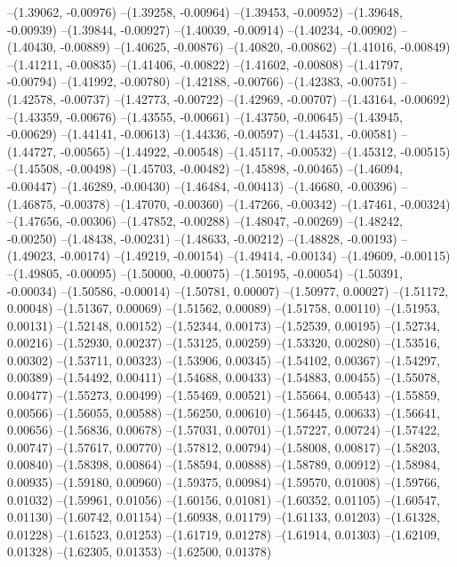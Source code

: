 --(1.39062, -0.00976)
--(1.39258, -0.00964)
--(1.39453, -0.00952)
--(1.39648, -0.00939)
--(1.39844, -0.00927)
--(1.40039, -0.00914)
--(1.40234, -0.00902)
--(1.40430, -0.00889)
--(1.40625, -0.00876)
--(1.40820, -0.00862)
--(1.41016, -0.00849)
--(1.41211, -0.00835)
--(1.41406, -0.00822)
--(1.41602, -0.00808)
--(1.41797, -0.00794)
--(1.41992, -0.00780)
--(1.42188, -0.00766)
--(1.42383, -0.00751)
--(1.42578, -0.00737)
--(1.42773, -0.00722)
--(1.42969, -0.00707)
--(1.43164, -0.00692)
--(1.43359, -0.00676)
--(1.43555, -0.00661)
--(1.43750, -0.00645)
--(1.43945, -0.00629)
--(1.44141, -0.00613)
--(1.44336, -0.00597)
--(1.44531, -0.00581)
--(1.44727, -0.00565)
--(1.44922, -0.00548)
--(1.45117, -0.00532)
--(1.45312, -0.00515)
--(1.45508, -0.00498)
--(1.45703, -0.00482)
--(1.45898, -0.00465)
--(1.46094, -0.00447)
--(1.46289, -0.00430)
--(1.46484, -0.00413)
--(1.46680, -0.00396)
--(1.46875, -0.00378)
--(1.47070, -0.00360)
--(1.47266, -0.00342)
--(1.47461, -0.00324)
--(1.47656, -0.00306)
--(1.47852, -0.00288)
--(1.48047, -0.00269)
--(1.48242, -0.00250)
--(1.48438, -0.00231)
--(1.48633, -0.00212)
--(1.48828, -0.00193)
--(1.49023, -0.00174)
--(1.49219, -0.00154)
--(1.49414, -0.00134)
--(1.49609, -0.00115)
--(1.49805, -0.00095)
--(1.50000, -0.00075)
--(1.50195, -0.00054)
--(1.50391, -0.00034)
--(1.50586, -0.00014)
--(1.50781, 0.00007)
--(1.50977, 0.00027)
--(1.51172, 0.00048)
--(1.51367, 0.00069)
--(1.51562, 0.00089)
--(1.51758, 0.00110)
--(1.51953, 0.00131)
--(1.52148, 0.00152)
--(1.52344, 0.00173)
--(1.52539, 0.00195)
--(1.52734, 0.00216)
--(1.52930, 0.00237)
--(1.53125, 0.00259)
--(1.53320, 0.00280)
--(1.53516, 0.00302)
--(1.53711, 0.00323)
--(1.53906, 0.00345)
--(1.54102, 0.00367)
--(1.54297, 0.00389)
--(1.54492, 0.00411)
--(1.54688, 0.00433)
--(1.54883, 0.00455)
--(1.55078, 0.00477)
--(1.55273, 0.00499)
--(1.55469, 0.00521)
--(1.55664, 0.00543)
--(1.55859, 0.00566)
--(1.56055, 0.00588)
--(1.56250, 0.00610)
--(1.56445, 0.00633)
--(1.56641, 0.00656)
--(1.56836, 0.00678)
--(1.57031, 0.00701)
--(1.57227, 0.00724)
--(1.57422, 0.00747)
--(1.57617, 0.00770)
--(1.57812, 0.00794)
--(1.58008, 0.00817)
--(1.58203, 0.00840)
--(1.58398, 0.00864)
--(1.58594, 0.00888)
--(1.58789, 0.00912)
--(1.58984, 0.00935)
--(1.59180, 0.00960)
--(1.59375, 0.00984)
--(1.59570, 0.01008)
--(1.59766, 0.01032)
--(1.59961, 0.01056)
--(1.60156, 0.01081)
--(1.60352, 0.01105)
--(1.60547, 0.01130)
--(1.60742, 0.01154)
--(1.60938, 0.01179)
--(1.61133, 0.01203)
--(1.61328, 0.01228)
--(1.61523, 0.01253)
--(1.61719, 0.01278)
--(1.61914, 0.01303)
--(1.62109, 0.01328)
--(1.62305, 0.01353)
--(1.62500, 0.01378)
